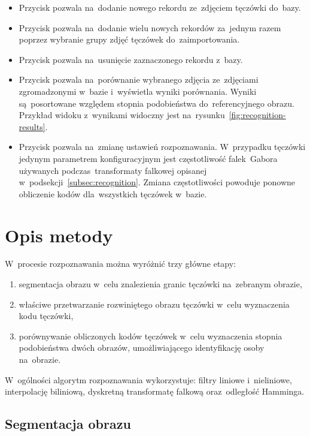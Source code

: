 \documentclass[11pt,a4paper]{article}
\begin{document}
\begin{itemize}
    \item Przycisk  pozwala na~dodanie nowego rekordu ze~zdjęciem tęczówki do~bazy.
    \item Przycisk  pozwala na~dodanie wielu nowych rekordów za~jednym razem poprzez wybranie grupy zdjęć tęczówek do~zaimportowania.
    \item Przycisk  pozwala na~usunięcie zaznaczonego rekordu z~bazy.
    \item Przycisk  pozwala na~porównanie wybranego zdjęcia ze~zdjęciami zgromadzonymi w~bazie i~wyświetla wyniki porównania.
    Wyniki są~posortowane względem stopnia podobieństwa do~referencyjnego obrazu.
    Przykład widoku z~wynikami widoczny jest na~rysunku~\ref{fig:recognition-results}.
    \item Przycisk  pozwala na~zmianę ustawień rozpoznawania.
    W~przypadku tęczówki jedynym parametrem konfiguracyjnym jest częstotliwość falek~Gabora używanych podczas~transformaty falkowej opisanej w~podsekcji~\ref{subsec:recognition}.
    Zmiana częstotliwości powoduje ponowne obliczenie kodów dla~wszystkich tęczówek w~bazie.
\end{itemize}

\section{Opis metody}
\label{sec:method}

W~procesie rozpoznawania można wyróżnić trzy główne etapy:
\begin{enumerate}
    \item segmentacja obrazu w~celu znalezienia granic tęczówki na~zebranym obrazie,
    \item właściwe przetwarzanie rozwiniętego obrazu tęczówki w~celu wyznaczenia kodu tęczówki,
    \item porównywanie obliczonych kodów tęczówek w~celu wyznaczenia stopnia podobieństwa dwóch obrazów, umożliwiającego identyfikację osoby na~obrazie.
\end{enumerate}
W~ogólności algorytm rozpoznawania wykorzystuje: filtry liniowe i~nieliniowe, interpolację biliniową, dyskretną transformatę falkową oraz~odległość Hamminga.

\subsection{Segmentacja obrazu}
\end{document}
